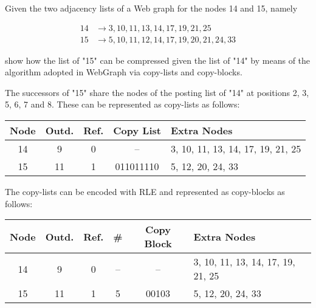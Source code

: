 \exercise

Given the two adjacency lists of a Web graph for the nodes 14 and 15, namely

\begin{align*}
	14 &\rightarrow 3, 10, 11, 13, 14, 17, 19, 21, 25 \\
	15 &\rightarrow 5, 10, 11, 12, 14, 17, 19, 20, 21, 24, 33
\end{align*}

show how the list of "15" can be compressed given the list of "14" by means of
the algorithm adopted in WebGraph via copy-lists and copy-blocks.

\solution

The successors of "15" share the nodes of the posting list of "14" at positions 2,
3, 5, 6, 7 and 8. These can be represented as copy-lists as follows:
%
\begin{longtable}{|c|c|c|c|l|}
  \hline
  Node & Outd. & Ref. & Copy List & Extra Nodes \\ \hline
  14 & 9  & 0 & --        & 3, 10, 11, 13, 14, 17, 19, 21, 25 \\
  15 & 11 & 1 & 011011110 & 5, 12, 20, 24, 33 \\ \hline
\end{longtable}
%
The copy-lists can be encoded with RLE and represented as copy-blocks as
follows:
%
\begin{longtable}{|c|c|c|c|c|l|}
  \hline
  Node & Outd. & Ref. & \# & Copy Block & Extra Nodes \\ \hline
  14 & 9  & 0 & -- & --    & 3, 10, 11, 13, 14, 17, 19, 21, 25 \\
  15 & 11 & 1 & 5  & 00103 & 5, 12, 20, 24, 33 \\ \hline
\end{longtable}
